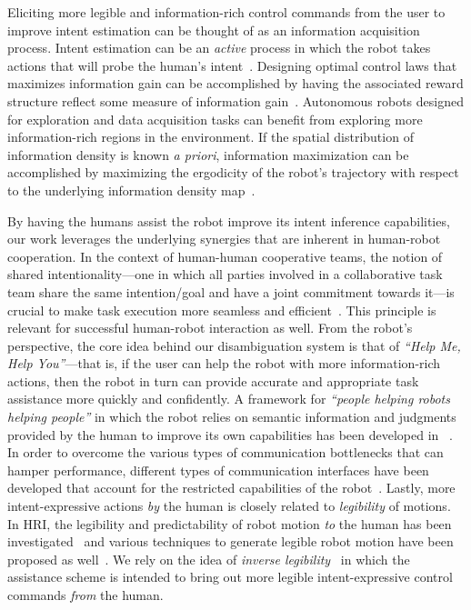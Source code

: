 Eliciting more legible and information-rich control commands from the user to improve intent estimation can be thought of as an information acquisition process. Intent estimation can be an \textit{active} process in which the robot takes actions that will probe the human's intent~\cite{sadigh2016information, sadigh2016planning}. Designing optimal control laws that maximizes information gain can be accomplished by having the associated reward structure reflect some measure of information gain~\cite{atanasov2014information}. 
Autonomous robots designed for exploration and data acquisition tasks can benefit from exploring more information-rich regions in the environment. If the spatial distribution of information density is known \textit{a priori}, information maximization can be accomplished by maximizing the ergodicity of the robot's trajectory with respect to the underlying information density map~\cite{miller2016ergodic, miller2013trajectory}. 

By having the humans assist the robot improve its intent inference capabilities, our work leverages the underlying synergies that are inherent in human-robot cooperation. In the context of human-human cooperative teams, the notion of shared intentionality---one in which all parties involved in a collaborative task team share the same intention/goal and have a joint commitment towards it---is crucial to make task execution more seamless and efficient~\cite{tomasello2007shared, tomasello2010gap}. This principle is relevant for successful human-robot interaction as well. From the robot's perspective, the core idea behind our disambiguation system is that of \textit{``Help Me, Help You''}---that is, if the user can help the robot with more information-rich actions, then the robot in turn can provide accurate and appropriate task assistance more quickly and confidently. A framework for \textit{``people helping robots helping people''} in which the robot relies on semantic information and judgments provided by the human to improve its own capabilities has been developed in ~\cite{sorokin2010people}. In order to overcome the various types of communication bottlenecks that can hamper performance, different types of communication interfaces have been developed that account for the restricted capabilities of the robot~\cite{goodfellow2010help}. Lastly, more intent-expressive actions \textit{by} the human is closely related to \textit{legibility} of motions. In HRI, the legibility and predictability of robot motion \textit{to} the human has been investigated~\cite{dragan2013legibility} and various techniques to generate legible robot motion have been proposed as well~\cite{holladay2014legible}. We rely on the idea of \textit{inverse legibility}~\cite{gopinath2017mode} in which the assistance scheme is intended to bring out more legible intent-expressive control commands \textit{from} the human. 
